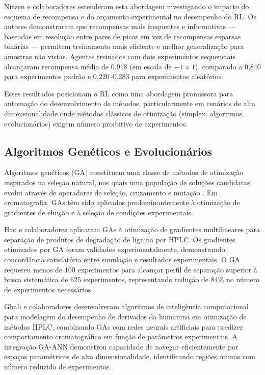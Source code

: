 \documentclass[preprint,12pt]{elsarticle}
\begin{document}
Niezen e colaboradores \cite{niezen2025} estenderam esta abordagem investigando o impacto do esquema de recompensa e do orçamento experimental no desempenho do RL. Os autores demonstraram que recompensas mais frequentes e informativas — baseadas em resolução entre pares de picos em vez de recompensas esparsas binárias — permitem treinamento mais eficiente e melhor generalização para amostras não vistas. Agentes treinados com dois experimentos sequenciais alcançaram recompensa média de 0,918 (em escala de \(-1\) a \(1\)), comparado a 0,840 para experimentos padrão e 0,220--0,283 para experimentos aleatórios.

Esses resultados posicionam o RL como uma abordagem promissora para automação do desenvolvimento de métodos, particularmente em cenários de alta dimensionalidade onde métodos clássicos de otimização (simplex, algoritmos evolucionários) exigem número proibitivo de experimentos.

\subsection{Algoritmos Genéticos e Evolucionários}

Algoritmos genéticos (GA) constituem uma classe de métodos de otimização inspirados na seleção natural, nos quais uma população de soluções candidatas evolui através de operadores de seleção, cruzamento e mutação \cite{hao2022}. Em cromatografia, GAs têm sido aplicados predominantemente à otimização de gradientes de eluição e à seleção de condições experimentais.

Hao e colaboradores \cite{hao2022} aplicaram GAs à otimização de gradientes multilineares para separação de produtos de degradação de lignina por HPLC. Os gradientes otimizados por GA foram validados experimentalmente, demonstrando concordância satisfatória entre simulação e resultados experimentais. O GA requereu menos de 100 experimentos para alcançar perfil de separação superior à busca sistemática de 625 experimentos, representando redução de 84\% no número de experimentos necessários.

Ghali e colaboradores \cite{ghali2020} desenvolveram algoritmos de inteligência computacional para modelagem do desempenho de derivados da humanina em otimização de métodos HPLC, combinando GAs com redes neurais artificiais para predizer comportamento cromatográfico em função de parâmetros experimentais. A integração GA-ANN demonstrou capacidade de navegar eficientemente por espaços paramétricos de alta dimensionalidade, identificando regiões ótimas com número reduzido de experimentos.
\end{document}
